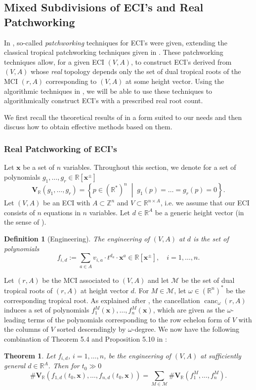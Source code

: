 \documentclass[a4paper]{article}
\newtheorem{definition}{Definition}
\newtheorem{theorem}{Theorem}
\theoremstyle{remark}
\newcommand{\setdes}[2]{\left\{#1\;\middle|\;#2\right\}}
\def\Var{\mathbf{V}}
\def\RR{\mathbb{R}}
\def\ZZ{\mathbb{Z}}
\def\xx{\mathbf{x}}
\DeclareMathOperator{\canc}{canc}
\begin{document}
\subsection{Mixed Subdivisions of ECI's and Real Patchworking}
\label{sec:realpatch}

In \cite[section 5]{esterovEngineeredCompleteIntersections2025},
so-called {\em patchworking} techniques for ECI's were given,
extending the classical tropical patchworking techniques given in
\cite{viro1982gluing, sturmfelsVirosTheoremComplete1994}. These
patchworking techniques allow, for a given ECI $(V,A)$, to construct
ECI's derived from $(V,A)$ whose \textit{real} topology depends only
the set of dual tropical roots of the MCI $(r,A)$ corresponding to
$(V,A)$ at some height vector. Using the algorithmic techniques in
, we will be able to use
these techniques to algorithmically construct ECI's with a prescribed
real root count.

We first recall the theoretical results of
\cite{esterovEngineeredCompleteIntersections2025} in a form suited to
our needs and then discuss how to obtain effective methods based on
them.

\subsubsection{Real Patchworking of ECI's}
\label{sec:realpatchone}

Let $\xx$ be a set of $n$ variables. Throughout this section, we
denote for a set of polynomials $g_1,\dots,g_r\in \RR[\xx^{\pm}]$
\[\Var_{\RR}(g_1,\dots,g_r) = \setdes{p \in (\RR^{*})^n}{g_1(p)=\ldots = g_r(p) = 0}.\]
Let $(V, A)$ be an ECI with $A\subset \ZZ^n$ and
$V\subset \RR^{n\times A}$, i.e. we assume that our ECI consists of
$n$ equations in $n$ variables. Let $d\in \RR^A$ be a generic height
vector (in the sense of ).
\begin{definition}[Engineering]
  The \textit{engineering} of $(V,A)$ at $d$ is the set of polynomials
  \[f_{i,d} := \sum_{a\in A}v_{i,a}\cdot t^{d_a} \cdot \xx^a\in \RR[\xx^{\pm}],\quad i = 1,\ldots, n.\]
\end{definition}
Let $(r,A)$ be the MCI associated to $(V,A)$ and let $\mathcal{M}$ be the set of
dual tropical roots of $(r,A)$ at height vector $d$. For
$M\in \mathcal{M}$, let $\omega\in (\RR^n)^{*}$ be the corresponding tropical root. As
explained after , the cancellation
$\canc_{\omega}(r,A)$ induces a set of polynomials
$f_1^M(\xx),\ldots,f_n^M(\xx)$, which are given as the
$\omega$-leading terms of the polynomials corresponding to the row echelon
form of $V$ with the columns of $V$ sorted descendingly by
$\omega$-degree. We now have the following combination of Theorem 5.4 and
Proposition 5.10 in \cite{esterovEngineeredCompleteIntersections2025}:
\begin{theorem}
  \label{thm:realrootcount}
  Let $f_{i,d}$, $i = 1,\ldots, n$, be the engineering of $(V,A)$ at
  sufficiently general $d\in \RR^A$. Then for $t_0\gg 0$
  \[\# \Var_{\RR}(f_{1,d}(t_0,\xx),\ldots,f_{n,d}(t_0,\xx)) = \sum_{M\in \mathcal{M}}\#
    \Var_{\RR}(f_1^M,\ldots, f_n^M). \]
\end{theorem}
\end{document}
